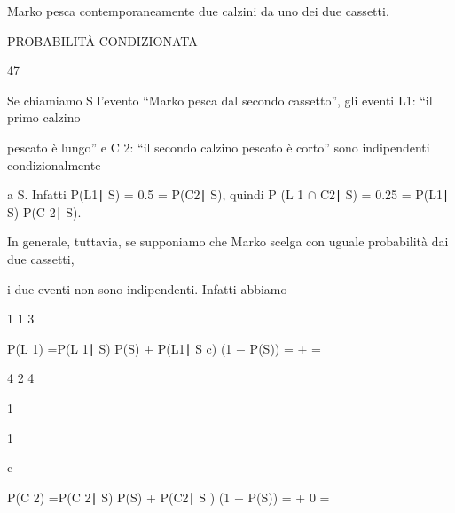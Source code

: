 \documentclass[a4paper,portrait,12pt]{article}
\begin{document}
\begin{flushleft}
Marko pesca contemporaneamente due calzini da uno dei due cassetti.
\end{flushleft}





\begin{flushleft}
\newpage
PROBABILIT\`{A} CONDIZIONATA
\end{flushleft}





47





\begin{flushleft}
Se chiamiamo S l'evento ``Marko pesca dal secondo cassetto'', gli eventi L1: ``il primo calzino
\end{flushleft}


\begin{flushleft}
pescato \`{e} lungo'' e C 2: ``il secondo calzino pescato \`{e} corto'' sono indipendenti condizionalmente
\end{flushleft}


\begin{flushleft}
a S. Infatti P(L1∣ S) = 0.5 = P(C2∣ S), quindi P (L 1 $\cap$ C2∣ S) = 0.25 = P(L1∣ S) P(C 2∣ S).
\end{flushleft}


\begin{flushleft}
In generale, tuttavia, se supponiamo che Marko scelga con uguale probabilit\`{a} dai due cassetti,
\end{flushleft}


\begin{flushleft}
i due eventi non sono indipendenti. Infatti abbiamo
\end{flushleft}


1 1 3


\begin{flushleft}
P(L 1) =P(L 1∣ S) P(S) + P(L1∣ S c) (1 $-$ P(S)) = + =
\end{flushleft}


4 2 4


1


1


\begin{flushleft}
c
\end{flushleft}


\begin{flushleft}
P(C 2) =P(C 2∣ S) P(S) + P(C2∣ S ) (1 $-$ P(S)) = + 0 =
\end{flushleft}
\end{document}
